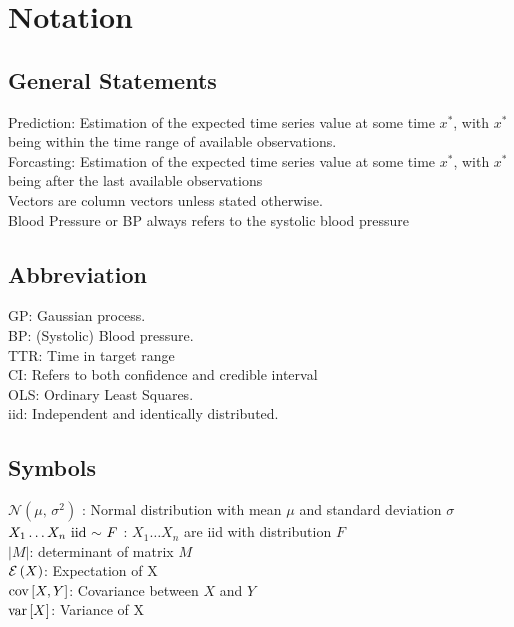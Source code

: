 \chapter*{Notation}
\label{c:Notation}


\section{General Statements}
Prediction: Estimation of the expected time series value at some time
$x^{\ast}$, with $x^{\ast}$ being within the time range of available observations.
\\
Forcasting: Estimation of the expected time series value at some time
$x^{\ast}$, with $x^{\ast}$ being after the last available observations \\
Vectors are column vectors unless stated otherwise. \\

Blood Pressure or BP always refers to the systolic blood pressure \\


\section{Abbreviation}\label{sec:abbreviation}
GP: Gaussian process. \\
BP: (Systolic) Blood pressure. \\
TTR: Time in target range \\
CI: Refers to both confidence and credible interval\\
OLS: Ordinary Least Squares. \\
iid: Independent and identically distributed.

\section{Symbols}\label{sec:symbols}
$\mathcal{N}(\mu,\,\sigma^{2})$ : Normal distribution with mean $\mu$ and standard deviation $\sigma$ \\
$X_1 \dots X_n \text{ iid }{\sim} \text{ } F$ : $X_1 \dots X_n$ are iid with distribution $F$ \\
$|M|$: determinant of matrix $M$ \\
$\ERW{X}$: Expectation of X \\
$\COV{X,Y}$: Covariance between $X$ and $Y$ \\
$\VAR{X}$: Variance of X


